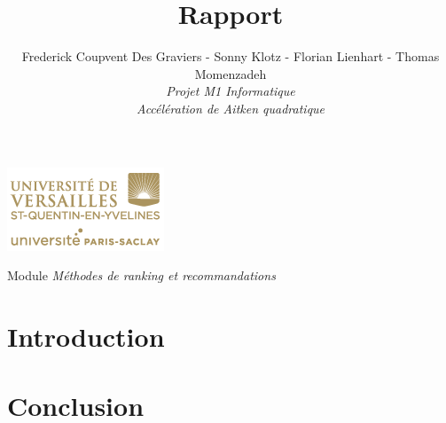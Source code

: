 
\usepackage[french,frenchkw,ruled,vlined]{../texLib/algorithm2e}

\title{\vspace{\fill}\textbf{\Huge Rapport}}
\author{
	Frederick Coupvent Des Graviers - Sonny Klotz - Florian Lienhart - Thomas Momenzadeh
	\vspace{2em}\\
	\textit{Projet M1 Informatique}\\\textit{Accélération de Aitken quadratique}
	\vspace{2em}
}



\clearpage
\maketitle\vspace{9em}
\begin{center}\includegraphics[scale=0.7]{logo.png}\end{center}
\begin{flushright}Module \textit{Méthodes de ranking et recommandations}\end{flushright}

\newpage
\tableofcontents

\newpage\clearpage{}

	\section*{Introduction}	
	
	
	
	
	
	
	\section*{Conclusion}
		


